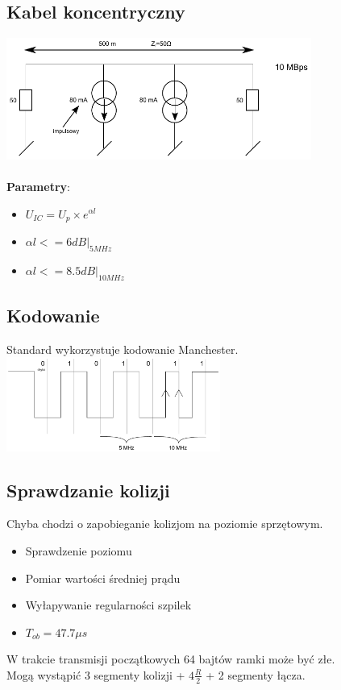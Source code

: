 \documentclass[a4paper,twoside]{article}
\begin{document}
	\subsection{Kabel koncentryczny}
		\includegraphics[width=10cm]{./images/image27.pdf}\\\\
		\textbf{Parametry}:
		\begin{itemize}
			\item $ U_{IC}=U_{p}\times e^{\alpha{l}} $
			\item $ \alpha{l} <= 6 dB|_{5 MHz} $
			\item $ \alpha{l} <= 8.5 dB|_{10 MHz} $
		\end{itemize}
	\subsection{Kodowanie}
		Standard wykorzystuje kodowanie Manchester.\\
		\includegraphics[width=7cm]{./images/image28.pdf}
	\subsection{Sprawdzanie kolizji}
		Chyba chodzi o zapobieganie kolizjom na poziomie sprzętowym.
		\begin{itemize}
			\item Sprawdzenie poziomu
			\item Pomiar wartości średniej prądu
			\item Wyłapywanie regularności szpilek
			\item $ T_{ob}=47.7 \mu{s} $
		\end{itemize}
		W trakcie transmisji początkowych 64 bajtów ramki może być złe.\\
		Mogą wystąpić 3 segmenty kolizji + $ 4 \frac{R}{2} $ + 2 segmenty łącza.
\end{document}

